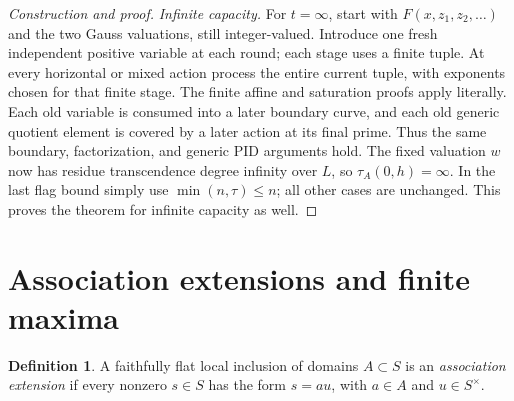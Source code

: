 \documentclass[11pt,reqno]{amsart}
\numberwithin{equation}{section}
\theoremstyle{plain}
\theoremstyle{definition}
\newtheorem{definition}[theorem]{Definition}
\theoremstyle{remark}
\begin{document}
\begin{proof}[Construction and proof]
\smallskip\noindent\emph{Infinite capacity.}
For \(t=\infty\), start with \(F(x,z_1,z_2,\ldots)\) and
the two Gauss valuations, still integer-valued.  Introduce one
fresh independent positive variable at each round; each stage
uses a finite tuple.  At every horizontal or mixed action process
the entire current tuple, with exponents chosen for that finite
stage.  The finite affine and saturation proofs apply literally.
Each old variable is consumed into a later boundary curve, and
each old generic quotient element is covered by a later action
at its final prime.  Thus the same boundary, factorization, and
generic PID arguments hold.  The fixed valuation \(w\) now has
residue transcendence degree infinity over \(L\), so
\(\tau_A(0,h)=\infty\).  In the last flag bound simply use
\(\min(n,\tau)\le n\); all other cases are unchanged.  This
proves the theorem for infinite capacity as well.
\end{proof}

\section{Association extensions and finite maxima}\label{sec:gluing}

\begin{definition}
A faithfully flat local inclusion of domains \(A\subset S\) is an
\emph{association extension} if every nonzero \(s\in S\) has the
form \(s=au\), with \(a\in A\) and \(u\in S^\times\).
\end{definition}
\end{document}
